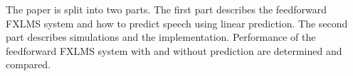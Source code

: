 The paper is split into two parts. The first part describes the feedforward FXLMS system and how to predict speech using linear prediction. The second part describes simulations and the implementation. Performance of the feedforward FXLMS system with and without prediction are determined and compared.
        











